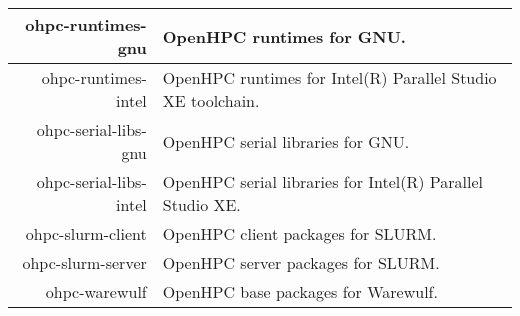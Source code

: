 \begin{tabularx}{\textwidth}{r|X}
\hline
ohpc-runtimes-gnu & OpenHPC runtimes for GNU. \\ 
\hline
ohpc-runtimes-intel & OpenHPC runtimes for Intel(R) Parallel Studio XE toolchain. \\ 
\hline
ohpc-serial-libs-gnu & OpenHPC serial libraries for GNU. \\ 
\hline
ohpc-serial-libs-intel & OpenHPC serial libraries for Intel(R) Parallel Studio XE. \\ 
\hline
ohpc-slurm-client & OpenHPC client packages for SLURM. \\ 
\hline
ohpc-slurm-server & OpenHPC server packages for SLURM. \\ 
\hline
ohpc-warewulf & OpenHPC base packages for Warewulf. \\ 
\hline
\bottomrule
\end{tabularx}
